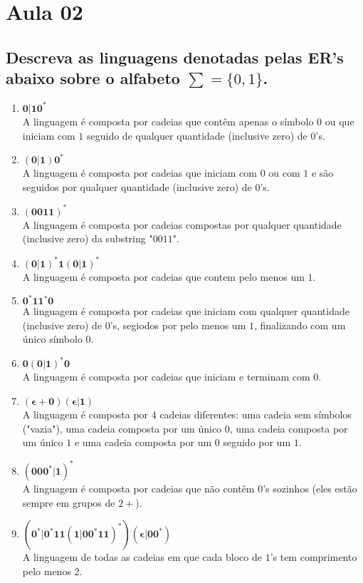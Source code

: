 \section{Aula 02 }
    \subsection{Descreva as linguagens denotadas pelas ER’s abaixo sobre o alfabeto $\sum = \{0,1\}$.}
    \begin{enumerate}[label=\textbf{\alph* -}]
        \item $\mathbf{0|10^*}$
            \\ A linguagem é composta por cadeias que contêm apenas o símbolo $0$ ou que iniciam com $1$ seguido de qualquer quantidade (inclusive zero) de $0$'s.
        \item $\mathbf{(0|1)0^*}$
            \\ A linguagem é composta por cadeias que iniciam com $0$ ou com $1$ e são seguidos por qualquer quantidade (inclusive zero) de $0$'s.
        \item $\mathbf{(0011)^*}$
            \\ A linguagem é composta por cadeias compostas por qualquer quan\-tidade (inclusive zero) da substring "$0011$".
        \item $\mathbf{(0|1)^*1(0|1)^*}$
            \\ A linguagem é composta por cadeias que contem pelo menos um $1$.
        \item $\mathbf{0^*11^*0}$
            \\ A linguagem é composta por cadeias que iniciam com qualquer quan\-tidade (inclusive zero) de $0$'s, segiodos por pelo menos um $1$, finalizando com um único símbolo $0$.
        \item $\mathbf{0(0|1)^*0}$
            \\ A linguagem é composta por cadeias que iniciam e  terminam com $0$.
        \item $\mathbf{(\epsilon+0)(\epsilon|1)}$
            \\ A linguagem é composta por 4 cadeias diferentes: uma cadeia sem símbolos ("vazia"), uma cadeia composta por um único $0$, uma cadeia composta por um único $1$ e uma cadeia composta por um $0$ seguido por um $1$.
        \item $\mathbf{(000^*|1)^*}$
            \\ A linguagem é composta por cadeias que não contêm $0$'s sozinhos (eles estão sempre em grupos de $2+$).
        \item $\mathbf{(0^*|0^*11(1|00^*11)^*)(\epsilon|00^*)}$
            \\ A linguagem de todas as cadeias em que cada bloco de $1$’s tem comprimento pelo menos 2.
    \end{enumerate}

